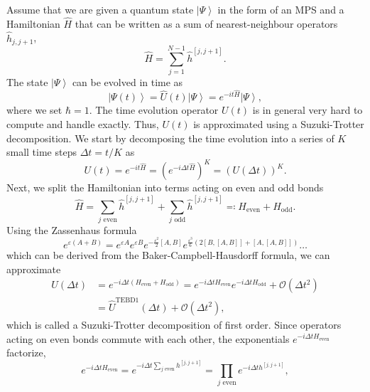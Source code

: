 Assume that we are given a quantum state $\left|\Psi\right\rangle$ in the form of an MPS and a Hamiltonian $\hat{H}$ that can be written as a sum of nearest-neighbour operators $\hat{h}_{j,j+1}$,
\begin{equation}
	\hat{H} = \sum_{j = 1}^{N-1} \hat{h}^{[j,j+1]}.
\end{equation}
The state $\left|\Psi\right\rangle$ can be evolved in time as
\begin{equation}
	\left|\Psi(t)\right\rangle = \hat{U}\left(t\right) \left|\Psi\right\rangle = e^{-it\hat{H}} \left|\Psi\right\rangle,
\end{equation}
where we set $\hbar = 1$. The time evolution operator $U(t)$ is in general very hard to compute and handle exactly. Thus, $U(t)$ is approximated using a Suzuki-Trotter decomposition. We start by decomposing the time evolution into a series of $K$ small time steps $\Delta t = t/K$ as
\begin{equation}
	U(t) = e^{-it\hat{H}} = \left(e^{-i\Delta t\hat{H}}\right)^K = \left(U(\Delta t)\right)^K.
\end{equation}
Next, we split the Hamiltonian into terms acting on even and odd bonds
\begin{equation}
	\hat{H} = \sum_{j \text{ even}}\hat{h}^{[j, j+1]} + \sum_{j \text{ odd}}\hat{h}^{[j, j+1]} \eqqcolon H_\text{even} + H_\text{odd}.
\end{equation}
Using the Zassenhaus formula
\begin{equation}
	e^{\varepsilon(A+B)} = e^{\varepsilon A} e^{\varepsilon B} e^{-\frac{\varepsilon^2}{2}[A, B]} e^{\frac{\varepsilon^3}{6}\left(2[B,[A,B]]+[A,[A,B]]\right)} \dots
\end{equation}
which can be derived from the Baker-Campbell-Hausdorff formula, we can approximate
\begin{equation}
	\begin{split}
		U(\Delta t) &= e^{-i\Delta t\left(H_\text{even} + H_\text{odd}\right)} = e^{-i\Delta tH_\text{even}}e^{-i\Delta tH_\text{odd}} + \mathcal{O}\left(\Delta t^2\right) \\
		&= \hat{U}^\text{TEBD1}(\Delta t) + \mathcal{O}\left(\Delta t^2\right),
	\end{split}
\end{equation}
which is called a Suzuki-Trotter decomposition of first order. Since operators acting on even bonds commute with each other, the exponentials $e^{-i\Delta tH_\text{even}}$ factorize,
\begin{equation}
	e^{-i\Delta tH_\text{even}} = e^{-i\Delta t\sum_{j \text{ even}} h^{[j, j+1]}} = \prod_{j \text{ even}} e^{-i\Delta t h^{[j, j+1]}},
\end{equation}
